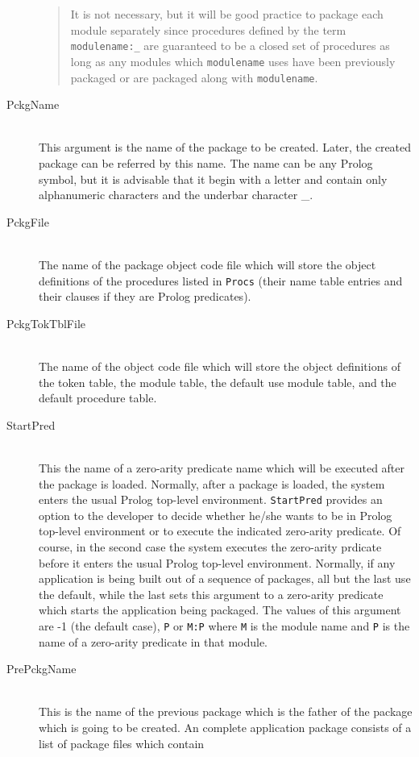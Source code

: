 \begin{description}
\begin{quotation}
It is not necessary, but it will be good practice to package
each module separately since procedures defined by
the term \verb|modulename:_| are guaranteed to be a closed set
of procedures as long as any modules which \verb|modulename| uses
have been previously packaged or are packaged along with
\verb|modulename|.
\end{quotation}
\item[PckgName] \ \\
This argument is the name of the package to be created.
Later, the created package can be referred by this name.
The name can be any Prolog symbol, but it is advisable that it
begin with a letter and contain only
alphanumeric characters and the underbar character \_. 
\item[PckgFile] \ \\
The name of the package object code file which will store 
the object definitions of the procedures listed in \verb|Procs|
(their name table entries and their clauses if they are 
Prolog predicates).
\item[PckgTokTblFile] \ \\
The name of the object code file which will store the object definitions of
the token table, the module table, the default use module table, and the default
procedure table.
\item[StartPred] \ \\
This the name of a zero-arity predicate name which will be executed
after the package is loaded. Normally, after a package is loaded,
the system enters the usual Prolog top-level environment. 
\verb|StartPred|
provides an option to the developer to decide whether he/she wants to 
be in Prolog top-level environment or to execute the indicated zero-arity predicate.
Of course, in the second case the system executes the zero-arity
prdicate before it enters the usual Prolog top-level
environment.  Normally, if any application is being built out of a sequence of
packages, all but the last use the default, while the last sets this argument
to a zero-arity predicate which starts the application being packaged.
The values of this argument are -1 (the default case), \verb|P| or
\verb|M:P| where \verb|M| is the module name and \verb|P| is the name of a 
zero-arity predicate in that module.
\item[PrePckgName] \ \\
This is the name of the previous package which is the father
of the package which is going to be created. An complete application
package consists of a list of package files which contain

\end{description}
